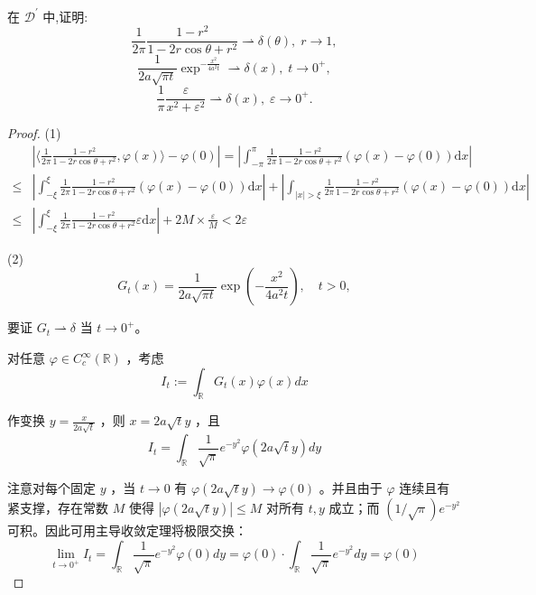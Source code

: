 \documentclass[lang=cn,newtx,10pt,scheme=chinese,thmcnt=chapter]{elegantbook}
\newcommand{\dif}{\mathrm{d}}
\begin{document}
\begin{problemset}
\item 在 \({\mathcal{D}}^{\prime }\) 中,证明:
\begin{equation*}
\frac{1}{2\pi }\frac{1 - {r}^{2}}{1 - {2r}\cos \theta  + {r}^{2}} \rightharpoonup  \delta \left( \theta \right) ,\;r \rightarrow  1,
\end{equation*}
\begin{equation*}
\frac{1}{{2a}\sqrt{\pi t}}{\exp }^{-\frac{{x}^{2}}{4{a}^{2}t}} \rightharpoonup  \delta \left( x\right) ,\;t \rightarrow  {0}^{ + },
\end{equation*}
\begin{equation*}
\frac{1}{\pi }\frac{\varepsilon }{{x}^{2} + {\varepsilon }^{2}} \rightharpoonup  \delta \left( x\right) ,\;\varepsilon  \rightarrow  {0}^{ + }.
\end{equation*}
\begin{proof}
    (1)
    \begin{equation*}
        \begin{aligned}
          & \left| \langle \frac{1}{2\pi }\frac{1 - {r}^{2}}{1 - {2r}\cos \theta  + {r}^{2}},\varphi(x)\rangle-\varphi(0)\right|=\left|\int_{-\pi}^\pi \frac{1}{2\pi }\frac{1 - {r}^{2}}{1 - {2r}\cos \theta  + {r}^{2}}(\varphi(x)-\varphi(0))\dif x \right|\\
           \leqslant& \left|\int_{-\xi}^\xi \frac{1}{2\pi }\frac{1 - {r}^{2}}{1 - {2r}\cos \theta  + {r}^{2}}(\varphi(x)-\varphi(0))\dif x \right|+ \left|\int_{|x|>\xi} \frac{1}{2\pi }\frac{1 - {r}^{2}}{1 - {2r}\cos \theta  + {r}^{2}}(\varphi(x)-\varphi(0))\dif x \right|
           \\           \leqslant &\left|\int_{-\xi}^\xi \frac{1}{2\pi }\frac{1 - {r}^{2}}{1 - {2r}\cos \theta  + {r}^{2}}\varepsilon\dif x \right|+ 2M\times\frac{\varepsilon}{M}<2\varepsilon
        \end{aligned}
    \end{equation*}

    (2)
$$
G_t(x)=\frac{1}{2 a \sqrt{\pi t}} \exp \left(-\frac{x^2}{4 a^2 t}\right), \quad t>0,
$$


要证 $G_t \rightharpoonup \delta$ 当 $t \rightarrow 0^{+}$。

对任意 $\varphi \in C_c^{\infty}(\mathbb{R})$ ，考虑
$$
I_t:=\int_{\mathbb{R}} G_t(x) \varphi(x) d x
$$


作变换 $y=\frac{x}{2 a \sqrt{t}}$ ，则 $x=2 a \sqrt{t} y$ ，且
$$
I_t=\int_{\mathbb{R}} \frac{1}{\sqrt{\pi}} e^{-y^2} \varphi(2 a \sqrt{t} y) d y
$$


注意对每个固定 $y$ ，当 $t \rightarrow 0$ 有 $\varphi(2 a \sqrt{t} y) \rightarrow \varphi(0)$ 。并且由于 $\varphi$ 连续且有紧支撑，存在常数 $M$ 使得 $|\varphi(2 a \sqrt{t} y)| \leq M$ 对所有 $t, y$ 成立；而 $(1 / \sqrt{\pi}) e^{-y^2}$ 可积。因此可用主导收敛定理将极限交换：
$$
\lim _{t \rightarrow 0^{+}} I_t=\int_{\mathbb{R}} \frac{1}{\sqrt{\pi}} e^{-y^2} \varphi(0) d y=\varphi(0) \cdot \int_{\mathbb{R}} \frac{1}{\sqrt{\pi}} e^{-y^2} d y=\varphi(0)
$$



\end{proof}
\end{problemset}
\end{document}
